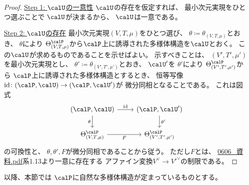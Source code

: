 \documentclass[report]{jlreq}
\begin{document}
\begin{proof}
    \uline{Step 1: $\calU$の一意性} \quad
    $\calU$の存在を仮定すれば、
    最小次元実現をひとつ選ぶことで
    $\calU$が決まるから、
    $\calU$は一意である。

    \uline{Step 2: $\calU$の存在} \quad
    最小次元実現$(V, T, \mu)$をひとつ選び、
    $\theta \coloneqq \theta_{(V, T, \mu)}$とおき、
    $\theta$により
    $\Theta^\calP_{(V, T, \mu)}$から$\calP$上に誘導された多様体構造を$\calU$とおく。
    この$\calU$が求めるものであることを示せばよい。
    示すべきことは、
    $(V', T', \mu')$を最小次元実現とし、
    $\theta' \coloneqq \theta_{(V', T', \mu')}$とおき、
    $\calU'$を
    $\theta'$により
    $\Theta^\calP_{(V', T', \mu')}$から
    $\calP$上に誘導された多様体構造とするとき、
    恒等写像$\id \colon (\calP, \calU) \to (\calP, \calU')$が
    微分同相となることである。
    これは図式
    \begin{equation}
        \begin{tikzcd}
            (\calP, \calU)
                \ar{d}[swap]{\theta}
                \ar{r}{\id}
                &(\calP, \calU')
                    \ar{d}{\theta'}
                \\
            \Theta^\calP_{(V, T, \mu)}
                \ar{r}[swap]{F}
                &\Theta^\calP_{(V', T', \mu')}
        \end{tikzcd}
    \end{equation}
    の可換性と、
    $\theta, \theta', F$が微分同相であることから従う。
    ただし$F$とは、
    \url{0606_資料.pdf}系1.13より一意に存在する
    アファイン変換$V^\vee \to V'^\vee$の制限である。
\end{proof}

以降、本節では
$\calP$に自然な多様体構造が定まっているものとする。

\end{document}
